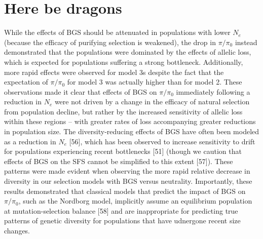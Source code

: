 \documentclass[9pt,twocolumn,twoside]{rilabRxiv}
\begin{document}
\section{Here be dragons}
While the effects of BGS should be attenuated in populations with lower $N_e$ (because the efficacy of purifying selection is weakened), the drop in $\pi/\pi_0$ instead demonstrated that the populations were dominated by the effects of allelic loss, which is expected for populations suffering a strong bottleneck.
Additionally, more rapid effects were observed for model 3s despite the fact that the expectation of $\pi/\pi_0$ for model 3 was actually higher than for model 2.
These observations made it clear that effects of BGS on $\pi/\pi_0$ immediately following a reduction in $N_e$ were not driven by a change in the efficacy of natural selection from population decline, but rather by the increased sensitivity of allelic loss within these regions -- with greater rates of loss accompanying greater reductions in population size.
The diversity-reducing effects of BGS have often been modeled as a reduction in $N_e$ [56], which has been observed to increase sensitivity to drift for populations experiencing recent bottlenecks [51] (though we caution that effects of BGS on the SFS cannot be simplified to this extent [57]).
These patterns were made evident when observing the more rapid relative decrease in diversity in our selection models with BGS versus neutrality.
Importantly, these results demonstrated that classical models that predict the impact of BGS on $\pi/\pi_0$, such as the Nordborg model, implicitly assume an equilibrium population at  mutation-selection balance [58] and are inappropriate for predicting true patterns of genetic diversity for populations that have udnergone recent size changes.
\end{document}
